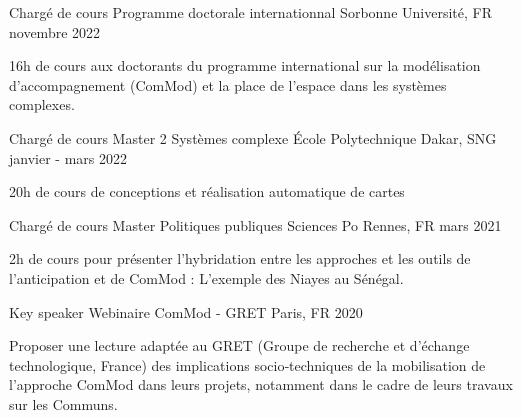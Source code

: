 

\begin{cventries}
  
  \cventry
    {Chargé de cours} %
    {Programme doctorale internationnal} %
    {Sorbonne Université, FR} %
    {novembre 2022} %
    {
      \begin{cvitems} %
        16h de cours aux doctorants du programme international sur la modélisation d'accompagnement (ComMod) et la place de l'espace dans les systèmes complexes. 
      \end{cvitems}
    }

  \cventry
    {Chargé de cours} %
    {Master 2 Systèmes complexe} %
    {\'Ecole Polytechnique Dakar, SNG} %
    {janvier - mars 2022} %
    {
      \begin{cvitems} %
      20h de cours de conceptions et réalisation automatique de cartes
      \end{cvitems}
    }

  \cventry
    {Chargé de cours} %
    {Master Politiques publiques} %
    {Sciences Po Rennes, FR} %
    {mars 2021} %
    {
      \begin{cvitems} %
      2h de cours pour présenter l'hybridation entre les approches et les outils de l'anticipation et de ComMod : L'exemple des Niayes au Sénégal.
      \end{cvitems}
    }

      \cventry
        {Key speaker} %
        {Webinaire ComMod - GRET} %
        {Paris, FR} %
        {2020} %
        {
          \begin{cvitems} %
            Proposer une lecture adaptée au GRET (Groupe de recherche et d’échange technologique, France) des implications socio‑techniques de la mobilisation de l’approche ComMod dans leurs projets, notamment dans le cadre de leurs travaux sur les Communs.
          \end{cvitems}
        }
        

\end{cventries}

